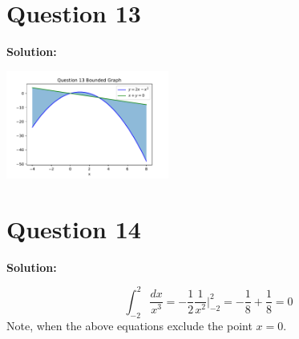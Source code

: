 \documentclass[11pt]{article} %
\begin{document}
\section{Question 13}
\textbf{Solution:}

\includegraphics[width=0.4\textwidth, angle=0]{question13.pdf}


\section{Question 14}
\textbf{Solution:}

$$\int_{-2}^{2}\frac{dx}{x^3}=-\frac{1}{2}\frac{1}{x^2}\bigg|_{-2}^{2}=-\frac{1}{8}+\frac{1}{8}=0$$
Note, when the above equations exclude the point $x=0$. 
\end{document}
